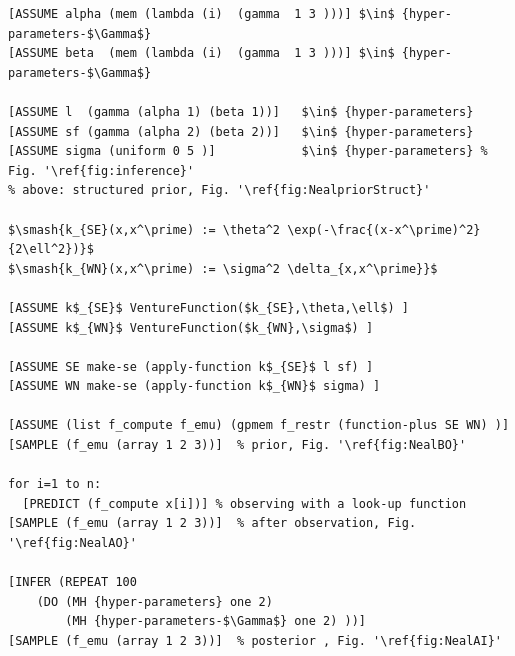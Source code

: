 \documentclass{article} %
\begin{document}
\begin{minipage}{\linewidth}
\footnotesize
\belowcaptionskip=-10pt
\begin{lstlisting}[frame=single,caption=Hierarchical  GP Smoothing,mathescape,label=alg:gphierarch,escapechar=']
[ASSUME alpha (mem (lambda (i)  (gamma  1 3 )))] $\in$ {hyper-parameters-$\Gamma$} 
[ASSUME beta  (mem (lambda (i)  (gamma  1 3 )))] $\in$ {hyper-parameters-$\Gamma$} 

[ASSUME l  (gamma (alpha 1) (beta 1))]   $\in$ {hyper-parameters} 
[ASSUME sf (gamma (alpha 2) (beta 2))]   $\in$ {hyper-parameters}
[ASSUME sigma (uniform 0 5 )]            $\in$ {hyper-parameters} % Fig. '\ref{fig:inference}'
% above: structured prior, Fig. '\ref{fig:NealpriorStruct}'

$\smash{k_{SE}(x,x^\prime) := \theta^2 \exp(-\frac{(x-x^\prime)^2}{2\ell^2})}$
$\smash{k_{WN}(x,x^\prime) := \sigma^2 \delta_{x,x^\prime}}$

[ASSUME k$_{SE}$ VentureFunction($k_{SE},\theta,\ell$) ]
[ASSUME k$_{WN}$ VentureFunction($k_{WN},\sigma$) ]

[ASSUME SE make-se (apply-function k$_{SE}$ l sf) ]
[ASSUME WN make-se (apply-function k$_{WN}$ sigma) ]

[ASSUME (list f_compute f_emu) (gpmem f_restr (function-plus SE WN) )]
[SAMPLE (f_emu (array 1 2 3))]  % prior, Fig. '\ref{fig:NealBO}'

for i=1 to n:
  [PREDICT (f_compute x[i])] % observing with a look-up function
[SAMPLE (f_emu (array 1 2 3))]  % after observation, Fig. '\ref{fig:NealAO}'
  
[INFER (REPEAT 100 
	(DO (MH {hyper-parameters} one 2)
	    (MH {hyper-parameters-$\Gamma$} one 2) ))]
[SAMPLE (f_emu (array 1 2 3))]  % posterior , Fig. '\ref{fig:NealAI}'
\end{lstlisting}
\end{minipage}
\end{document}
